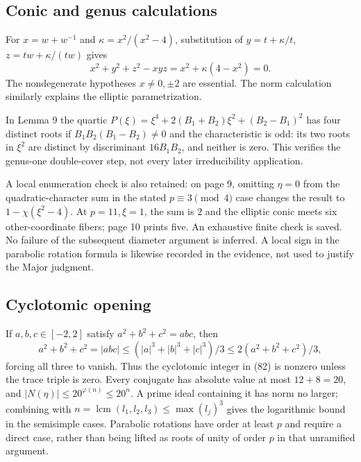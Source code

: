 \documentclass[10pt]{article}
\begin{document}
\subsection*{Conic and genus calculations}
For \(x=w+w^{-1}\) and \(\kappa=x^2/(x^2-4)\), substitution of \(y=t+\kappa/t\), \(z=tw+\kappa/(tw)\) gives \[x^2+y^2+z^2-xyz=x^2+\kappa(4-x^2)=0.\] The nondegenerate hypotheses \(x\ne0,\pm2\) are essential. The norm calculation similarly explains the elliptic parametrization.\par
In Lemma 9 the quartic \(P(\xi)=\xi^4+2(B_1+B_2)\xi^2+(B_2-B_1)^2\) has four distinct roots if \(B_1B_2(B_1-B_2)\ne0\) and the characteristic is odd: its two roots in \(\xi^2\) are distinct by discriminant \(16B_1B_2\), and neither is zero. This verifies the genus-one double-cover step, not every later irreducibility application.\par
A local enumeration check is also retained: on page 9, omitting \(\eta=0\) from the quadratic-character sum in the stated \(p\equiv3\pmod4\) case changes the result to \(1-\chi(\xi^2-4)\). At \(p=11,\xi=1\), the sum is \(2\) and the elliptic conic meets six other-coordinate fibers; page 10 prints five. An exhaustive finite check is saved. No failure of the subsequent diameter argument is inferred. A local sign in the parabolic rotation formula is likewise recorded in the evidence, not used to justify the Major judgment.\par
\subsection*{Cyclotomic opening}
If \(a,b,c\in[-2,2]\) satisfy \(a^2+b^2+c^2=abc\), then \[a^2+b^2+c^2=|abc|
\le (|a|^3+|b|^3+|c|^3)/3
\le 2(a^2+b^2+c^2)/3,\] forcing all three to vanish. Thus the cyclotomic integer in (82) is nonzero unless the trace triple is zero. Every conjugate has absolute value at most \(12+8=20\), and \(|N(\eta)|\le20^{\varphi(n)}\le20^n\). A prime ideal containing it has norm no larger; combining with \(n=\operatorname{lcm}(l_1,l_2,l_3)\le\max(l_j)^3\) gives the logarithmic bound in the semisimple cases. Parabolic rotations have order at least \(p\) and require a direct case, rather than being lifted as roots of unity of order \(p\) in that unramified argument.\par
\end{document}
